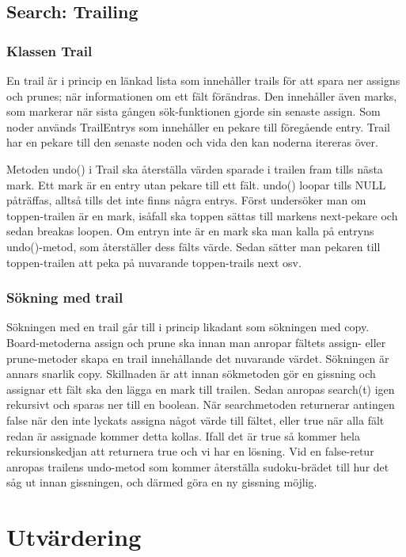 \documentclass[a4paper, 11pt]{article}
\begin{document}
\subsection{Search: Trailing}

\subsubsection{Klassen Trail}

En trail är i princip en länkad lista som innehåller trails för att spara ner assigns och prunes; när informationen om ett fält förändras. Den innehåller även marks, som markerar när sista gången sök-funktionen gjorde sin senaste assign. Som noder används TrailEntrys som innehåller en pekare till föregående entry. Trail har en pekare till den senaste noden och vida den kan noderna itereras över.

Metoden undo() i Trail ska återställa värden sparade i trailen fram tills nästa mark. Ett mark är en entry utan pekare till ett fält. undo() loopar tills NULL påträffas, alltså tills det inte finns några entrys. Först undersöker man om toppen-trailen är en mark, isåfall ska toppen sättas till markens next-pekare och sedan breakas loopen. Om entryn inte är en mark ska man kalla på entryns undo()-metod, som återställer dess fälts värde. Sedan sätter man pekaren till toppen-trailen att peka på nuvarande toppen-trails next osv.

\subsubsection{Sökning med trail}

Sökningen med en trail går till i princip likadant som sökningen med copy. Board-metoderna assign och prune ska innan man anropar fältets assign- eller prune-metoder skapa en trail innehållande det nuvarande värdet. Sökningen är annars snarlik copy. Skillnaden är att innan sökmetoden gör en gissning och assignar ett fält ska den lägga en mark till trailen. Sedan anropas search(t) igen rekursivt och sparas ner till en boolean. När searchmetoden returnerar antingen false när den inte lyckats assigna något värde till fältet, eller true när alla fält redan är assignade kommer detta kollas. Ifall det är true så kommer hela rekursionskedjan att returnera true och vi har en lösning. Vid en false-retur anropas trailens undo-metod som kommer återställa sudoku-brädet till hur det såg ut innan gissningen, och därmed göra en ny gissning möjlig. 

\section{Utvärdering}
\end{document}
